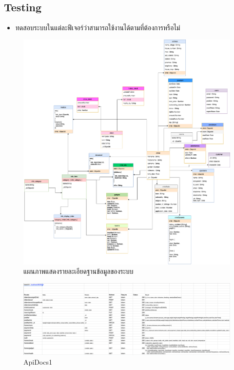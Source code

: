 \subsection{Testing}
\begin{itemize}
  \item ทดสอบระบบในแต่ละฟีเจอร์ว่าสามารถใช้งานได้ตามที่ต้องการหรือไม่
\end{itemize}

\begin{landscape}
  \begin{figure}
    \begin{center}
    \includegraphics[height=0.9\textheight]{images/NurseryDiagram.png}
    \end{center}
  \caption{แผนภาพแสดงรายละเอียดฐานข้อมูลของระบบ}
  \label{fig:DatabaseDiagram}
\end{figure}
\end{landscape}

\begin{figure}
  \begin{center}
    \includegraphics[width=\linewidth]{images/ApiDocOne.png}
  \end{center}
  \caption[Poem]{ApiDocs1}
  \label{fig:ApiDocs1}
\end{figure}

